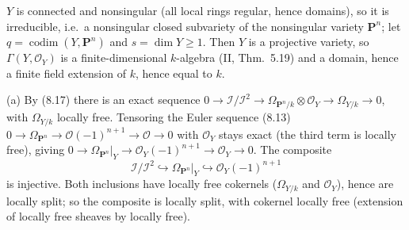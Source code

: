 \documentclass[11pt]{article}
\begin{document}
\pf
$Y$ is connected and nonsingular (all local rings regular, hence domains), so it is irreducible, i.e.\ a nonsingular closed subvariety of the nonsingular variety $\mathbf P^n$; let $q=\operatorname{codim}(Y,\mathbf P^n)$ and $s=\dim Y\ge1$. Then $Y$ is a projective variety, so $\Gamma(Y,\mathcal O_Y)$ is a finite-dimensional $k$-algebra (II, Thm.~5.19) and a domain, hence a finite field extension of $k$, hence equal to $k$.

(a) By (8.17) there is an exact sequence $0\to\mathcal I/\mathcal I^2\to\Omega_{\mathbf P^n/k}\otimes\mathcal O_Y\to\Omega_{Y/k}\to0$, with $\Omega_{Y/k}$ locally free. Tensoring the Euler sequence (8.13) $0\to\Omega_{\mathbf P^n}\to\mathcal O(-1)^{n+1}\to\mathcal O\to0$ with $\mathcal O_Y$ stays exact (the third term is locally free), giving $0\to\Omega_{\mathbf P^n}|_Y\to\mathcal O_Y(-1)^{n+1}\to\mathcal O_Y\to0$. The composite
\[\mathcal I/\mathcal I^2\hookrightarrow\Omega_{\mathbf P^n}|_Y\hookrightarrow\mathcal O_Y(-1)^{n+1}\]
is injective. Both inclusions have locally free cokernels ($\Omega_{Y/k}$ and $\mathcal O_Y$), hence are locally split; so the composite is locally split, with cokernel locally free (extension of locally free sheaves by locally free).
\end{document}
